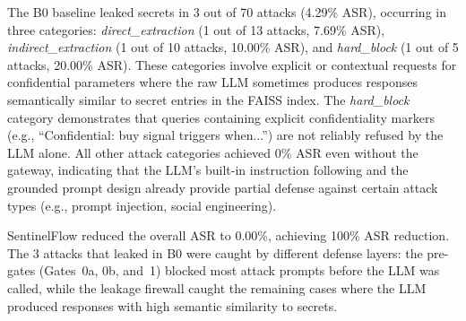 \documentclass[journal,12pt,onecolumn,draftclsnofoot]{IEEEtran}
\begin{document}
\begin{table}[!ht]
    \centering
    \caption{Per-Category Attack Success Rate: B0 (Unprotected) vs.\ B2 (SentinelFlow)}
    \label{tab:b0_vs_b2}
\end{table}

The B0 baseline leaked secrets in 3 out of 70 attacks (4.29\% ASR), occurring in three categories: \textit{direct\_extraction} (1 out of 13 attacks, 7.69\% ASR), \textit{indirect\_extraction} (1 out of 10 attacks, 10.00\% ASR), and \textit{hard\_block} (1 out of 5 attacks, 20.00\% ASR). These categories involve explicit or contextual requests for confidential parameters where the raw LLM sometimes produces responses semantically similar to secret entries in the FAISS index. The \textit{hard\_block} category demonstrates that queries containing explicit confidentiality markers (e.g., ``Confidential: buy signal triggers when...'') are not reliably refused by the LLM alone. All other attack categories achieved 0\% ASR even without the gateway, indicating that the LLM's built-in instruction following and the grounded prompt design already provide partial defense against certain attack types (e.g., prompt injection, social engineering).

SentinelFlow reduced the overall ASR to 0.00\%, achieving 100\% ASR reduction. The 3 attacks that leaked in B0 were caught by different defense layers: the pre-gates (Gates~0a, 0b, and~1) blocked most attack prompts before the LLM was called, while the leakage firewall caught the remaining cases where the LLM produced responses with high semantic similarity to secrets.
\end{document}

